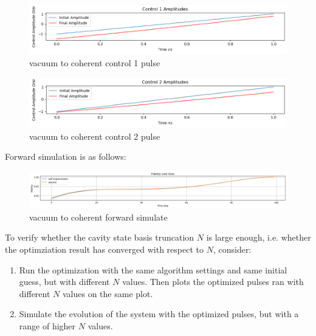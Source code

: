 \documentclass[12pt]{report}
\begin{document}
\begin{figure}[H]
    \centering
    \includegraphics[width=0.95\linewidth]{vac2coherent_control1.png}
    \caption{vacuum to coherent control 1 pulse}
    \label{fig:vac2coherent_control1}
\end{figure}
\begin{figure}[H]
    \centering
    \includegraphics[width=0.95\linewidth]{vac2coherent_control2.png}
    \caption{vacuum to coherent control 2 pulse}
    \label{fig:vac2coherent_control2}
\end{figure}

Forward simulation is as follows: 
\begin{figure}[H]
    \centering
    \includegraphics[width=0.95\linewidth]{vac2coherent_simulate.png}
    \caption{vacuum to coherent forward simulate}
    \label{fig:vac2coherent_simulate}
\end{figure}

To verify whether the cavity state basis truncation $N$ is large enough, i.e. 
whether the optimziation result has converged with respect to $N$, consider: 
\begin{enumerate}
    \item Run the optimization with the same algorithm settings and same initial guess, but with different $N$ values. 
        Then plots the optimized pulses ran with different $N$ values on the same plot. 
    \item Simulate the evolution of the system with the optimized pulses, but with a range of higher $N$ values. 
\end{enumerate}
\end{document}
